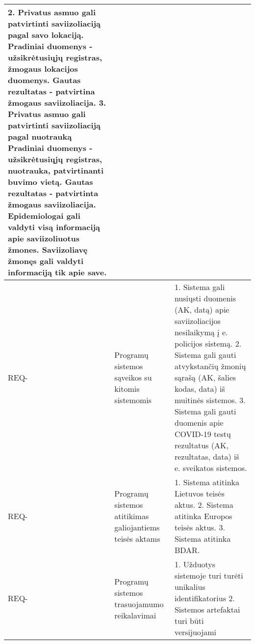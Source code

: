 \documentclass{VUMIFPSkursinis}
\newcounter{counter}
\newcommand{\reqCode}{%
	 \stepcounter{counter}%
	\color{blue} REQ-\thecounter}
\begin{document}
\begin{center}
\begin{longtable}{|C{2cm}|L{5cm}|L{8cm}|}
		{\color{blue} 2. Privatus asmuo gali patvirtinti saviizoliaciją pagal savo lokaciją}. \textbf{Pradiniai duomenys} - užsikrėtusiųjų registras, žmogaus lokacijos duomenys. \textbf{Gautas rezultatas} - {\color{blue} patvirtina} žmogaus saviizoliacija.
		{\color{blue} 3. Privatus asmuo gali patvirtinti saviizoliaciją pagal nuotrauką \textbf{Pradiniai duomenys} - užsikrėtusiųjų registras, nuotrauka, patvirtinanti buvimo vietą. \textbf{Gautas rezultatas} - patvirtinta žmogaus saviizoliacija}.
		Epidemiologai gali valdyti visą informaciją apie saviizoliuotus žmones. Saviizoliavę žmonęs gali valdyti informaciją tik apie save.
		\\ \hline
		\reqCode                                                          &
		Programų sistemos sąveikos su kitomis sistemomis                  &
		{\color{blue} 1. Sistema gali nusiųsti duomenis (AK, datą) apie saviizoliacijos nesilaikymą į} e. policijos sistemą.
		{\color{blue} 2. Sistema gali gauti atvykstančių žmonių sąrašą (AK, šalies kodas, data) iš} muitinės sistemos.
		{\color{blue} 3. Sistema gali gauti duomenis apie COVID-19 testų rezultatus (AK, rezultatas, data) iš} e. sveikatos sistemos.
		\\ \hline
		\reqCode                                                          &
		Programų sistemos atitikimas galiojantiems teisės aktams          &
		{\color{blue} 1.} Sistema atitinka Lietuvos teisės aktus.
		{\color{blue} 2.} Sistema atitinka Europos teisės aktus.
		{\color{blue} 3.} Sistema atitinka BDAR.                                                                                                                                                                                                                                                                                                                                                                                                                                                                                                                                                                                                                                                                                                                                                              \\ \hline
		\reqCode                                                          &
		Programų sistemos trasuojamumo reikalavimai                       &
		{\color{blue} 1.} Užduotys sistemoje turi turėti unikalius identifikatorius                                  
		{\color{blue} 2. Sistemos artefaktai turi būti versijuojami }                                  

\end{longtable}
\end{center}
\end{document}
